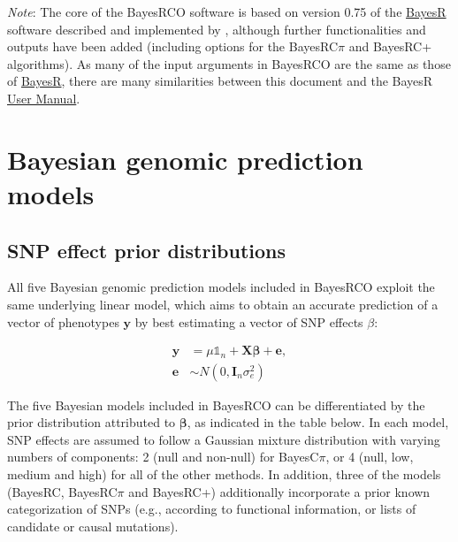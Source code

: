 \documentclass{ol-softwaremanual}
\begin{document}
\begin{tcolorbox}
{\it Note}: The core of the BayesRCO software is based on version 0.75 of the \href{https://github.com/syntheke/bayesR/tree/master/old}{BayesR} software described and implemented by \citet{moser_simultaneous_2015}, although further functionalities and outputs have been added (including options for the BayesRC$\pi$ and BayesRC+ algorithms). As many of the input arguments in BayesRCO are the same as those of \href{https://github.com/syntheke/bayesR/tree/master/old}{BayesR}, there are many similarities between this document and the BayesR \href{https://github.com/syntheke/bayesR/blob/master/old/doc/BayesRmanual-0.75.pdf}{User Manual}.
\end{tcolorbox}


\section{Bayesian genomic prediction models}

\subsection{SNP effect prior distributions}

All five Bayesian genomic prediction models included in BayesRCO exploit the same underlying linear model, which aims to obtain an accurate prediction of a vector of phenotypes $\mathbf{y}$ by best estimating a vector of SNP effects $\beta$: 

\begin{align*}
\mathbf{y}&=\mu \mathds{1}_n+\mathbf{X}\boldsymbol{\beta}+{\mathbf{e}}, \\
{\mathbf{e}} &\sim N(0,\mathbf{I}_n\sigma^2_e) \nonumber
\end{align*}

\noindent The five Bayesian models included in BayesRCO can be differentiated by the prior distribution attributed to $\boldsymbol{\beta}$, as indicated in the table below. In each model, SNP effects are assumed to follow a Gaussian mixture distribution with varying numbers of components: 2 (null and non-null) for BayesC$\pi$, or 4 (null, low, medium and high) for all of the other methods. In addition, three of the models (BayesRC, BayesRC$\pi$ and BayesRC+) additionally incorporate a prior known categorization of SNPs (e.g., according to functional information, or lists of candidate or causal mutations).
\end{document}
